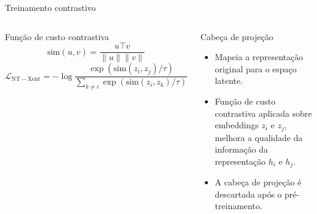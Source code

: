 \documentclass[aspectratio=169,10pt]{beamer}
\newcommand{\tightitem}{\setlength{\itemsep}{3pt}\setlength{\parskip}{0pt}}
\begin{document}
\begin{frame}{Treinamento contrastivo}
\begin{columns}[T,onlytextwidth]
  \begin{block}{Função de custo contrastiva}
  \[
  \text{sim}(u, v) = \frac{u\top v}{\|u\|\|v\|}
  \]
  \vspace{2mm}
  \[
  \mathcal L_{\mathrm{NT-Xent}}
  =-\log
  \frac{\exp(\mathrm{sim}(z_i,z_j)/\tau)}
  {\sum_{k\neq i}\exp(\mathrm{sim}(z_i,z_k)/\tau)}
  \]
  \end{block}
  \begin{block}{Cabeça de projeção}
  \begin{itemize}\tightitem
    \item Mapeia a representação original para o espaço latente.
    \item Função de custo contrastiva aplicada sobre embeddings $z_i$ e $z_j$, melhora a qualidade da informação da representação $h_i$ e $h_j$.
    \item A cabeça de projeção é descartada após o pré-treinamento.
  \end{itemize}
  \end{block}
\end{columns}
\end{frame}
\end{document}

